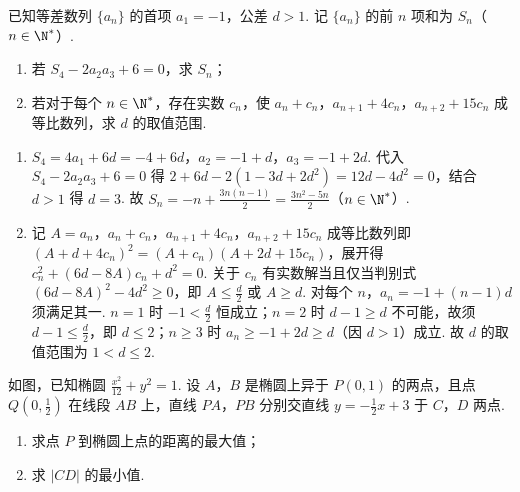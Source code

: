 \begin{problem}
已知等差数列 \(\{a_n\}\) 的首项 \(a_1=-1\)，公差 \(d>1\). 记 \(\{a_n\}\) 的前 \(n\) 项和为 \(S_n\)（\(n\in\N^*\)）.

\begin{enumerate}
\item 若 \(S_4-2a_2a_3+6=0\)，求 \(S_n\)；

\item 若对于每个 \(n\in\N^*\)，存在实数 \(c_n\)，使 \(a_n+c_n\)，\(a_{n+1}+4c_n\)，\(a_{n+2}+15c_n\) 成等比数列，求 \(d\) 的取值范围.
\end{enumerate}
\end{problem}

\begin{solution}
\begin{enumerate}
\item \(S_4=4a_1+6d=-4+6d\)，\(a_2=-1+d\)，\(a_3=-1+2d\). 代入 \(S_4-2a_2a_3+6=0\) 得 \(2+6d-2(1-3d+2d^2)=12d-4d^2=0\)，结合 \(d>1\) 得 \(d=3\). 故 \(S_n=-n+\frac{3n(n-1)}2=\frac{3n^2-5n}2\)（\(n\in\N^*\)）.
\item 记 \(A=a_n\)，\(a_n+c_n\)，\(a_{n+1}+4c_n\)，\(a_{n+2}+15c_n\) 成等比数列即 \((A+d+4c_n)^2=(A+c_n)(A+2d+15c_n)\)，展开得 \(c_n^2+(6d-8A)c_n+d^2=0\). 关于 \(c_n\) 有实数解当且仅当判别式 \((6d-8A)^2-4d^2\ge0\)，即 \(A\le\frac d2\) 或 \(A\ge d\). 对每个 \(n\)，\(a_n=-1+(n-1)d\) 须满足其一. \(n=1\) 时 \(-1<\frac d2\) 恒成立；\(n=2\) 时 \(d-1\ge d\) 不可能，故须 \(d-1\le\frac d2\)，即 \(d\le2\)；\(n\ge3\) 时 \(a_n\ge-1+2d\ge d\)（因 \(d>1\)）成立. 故 \(d\) 的取值范围为 \(1<d\le2\).
\end{enumerate}
\end{solution}

\begin{problem}
如图，已知椭圆 \(\frac{x^2}{12}+y^2=1\). 设 \(A\)，\(B\) 是椭圆上异于 \(P(0,1)\) 的两点，且点 \(Q\left(0,\frac12\right)\) 在线段 \(AB\) 上，直线 \(PA\)，\(PB\) 分别交直线 \(y=-\frac12x+3\) 于 \(C\)，\(D\) 两点.

\begin{enumerate}
\item 求点 \(P\) 到椭圆上点的距离的最大值；

\item 求 \(|CD|\) 的最小值.
\end{enumerate}

\end{problem}

